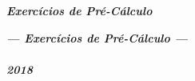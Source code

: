 \documentclass[pdftex, brazil, 12pt, oneside, addpoints]{exam}
\begin{document}
\begin{coverpages}

\begin{center}
\textbf{\textit{\Large%
Exercícios de Pré-Cálculo}}
\end{center}

\vspace{1cm}

\begin{figure}[H]
\begin{center}
\end{center}
\end{figure}

\vspace{1cm}

\begin{center}
\textit{\textbf{\Large%
--- Exercícios de Pré-Cálculo ---\\
\ \\
2018}}
\end{center}



\end{coverpages}
\end{document}
